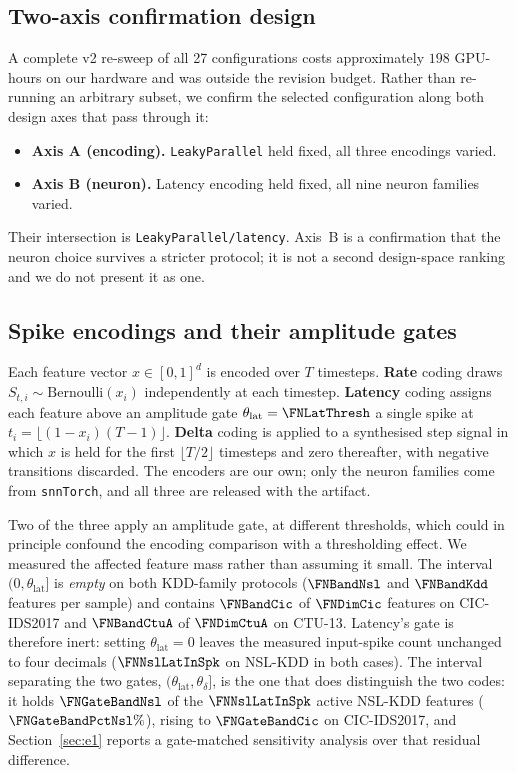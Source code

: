 \subsection{Two-axis confirmation design}

A complete v2 re-sweep of all 27 configurations costs approximately $198$
GPU-hours on our hardware and was outside the revision budget. Rather than
re-running an arbitrary subset, we confirm the selected configuration along both
design axes that pass through it:

\begin{itemize}
  \item \textbf{Axis A (encoding).} \texttt{LeakyParallel} held fixed, all three
        encodings varied.
  \item \textbf{Axis B (neuron).} Latency encoding held fixed, all nine neuron
        families varied.
\end{itemize}

Their intersection is \texttt{LeakyParallel/latency}. Axis~B is a confirmation
that the neuron choice survives a stricter protocol; it is not a second
design-space ranking and we do not present it as one.

\subsection{Spike encodings and their amplitude gates}
\label{sec:enc}

Each feature vector $x\in[0,1]^d$ is encoded over $T$ timesteps. \textbf{Rate}
coding draws $S_{t,i}\sim\mathrm{Bernoulli}(x_i)$ independently at each
timestep. \textbf{Latency} coding assigns each feature above an amplitude gate
$\theta_\mathrm{lat}=\FNLatThresh$ a single spike at
$t_i=\lfloor(1-x_i)(T-1)\rfloor$. \textbf{Delta} coding is applied to a
synthesised step signal in which $x$ is held for the first $\lfloor T/2\rfloor$
timesteps and zero thereafter, with negative transitions discarded. The
encoders are our own; only the neuron families come from \texttt{snnTorch}, and
all three are released with the artifact.

Two of the three apply an amplitude gate, at different thresholds, which could
in principle confound the encoding comparison with a thresholding effect. We
measured the affected feature mass rather than assuming it small. The interval
$(0,\theta_\mathrm{lat}]$ is \emph{empty} on both KDD-family protocols
($\FNBandNsl$ and $\FNBandKdd$ features per sample) and contains
$\FNBandCic$ of $\FNDimCic$ features on CIC-IDS2017 and $\FNBandCtuA$ of
$\FNDimCtuA$ on CTU-13. Latency's gate is therefore inert: setting
$\theta_\mathrm{lat}=0$ leaves the measured input-spike count unchanged to four
decimals ($\FNNslLatInSpk$ on NSL-KDD in both cases). The interval separating
the two gates, $(\theta_\mathrm{lat},\theta_\delta]$, is the one that does
distinguish the two codes: it holds $\FNGateBandNsl$ of the $\FNNslLatInSpk$
active NSL-KDD features ($\FNGateBandPctNsl\%$), rising to
$\FNGateBandCic$ on CIC-IDS2017, and
Section~\ref{sec:e1} reports a gate-matched sensitivity analysis over that
residual difference.

